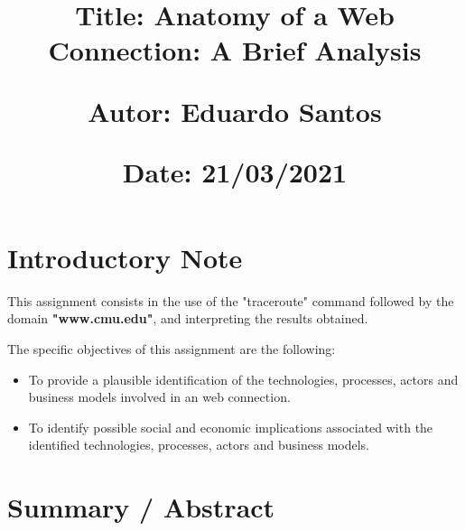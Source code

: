 \documentclass{article}
\newcommand\tab[1][1cm]{\hspace*{#1}}
\begin{document}
\title{\vspace{-0.9cm}
       \vspace{1cm}
       \normalsize
       \raggedright\textbf{Title: \hspace{1.5cm} Anatomy of a Web Connection: A Brief Analysis} \\ \vspace{0.4cm}
       \raggedright\textbf{Autor: \hspace{1.3cm} Eduardo Santos} \\ \vspace{0.4cm}
       \raggedright\textbf{Date: \hspace{1.45cm} 21/03/2021} \\}
\author{}
\date{}

\maketitle
\thispagestyle{fancy}


\vspace{-1.4cm}

\tableofcontents


\fontsize{10pt}{13pt}
\selectfont
\lsstyle


\section{Introductory Note}

\tab This assignment consists in the use of the "traceroute" command followed by the domain \textbf{"www.cmu.edu"}, and interpreting the results obtained.  

\noindent The specific objectives of this assignment are the following:

\begin{itemize}
    \item To provide a plausible identification of the technologies, processes, actors and business models involved in an web connection.
    \item To identify possible social and economic implications associated with the identified technologies, processes, actors and business models.
\end{itemize}

\section{Summary / Abstract}
\end{document}
